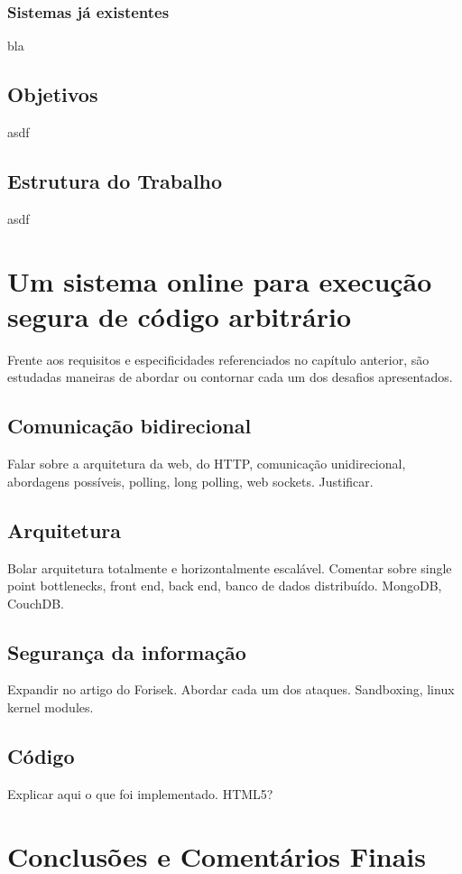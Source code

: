 \documentclass[ruledheader]{abnt}
\begin{document}
\subsection{Sistemas já existentes}

bla

\section{Objetivos}
asdf
\section{Estrutura do Trabalho}
asdf

\chapter{Um sistema online para execução segura de código arbitrário}

Frente aos requisitos e especificidades referenciados no capítulo anterior, são estudadas maneiras de abordar ou contornar cada um dos desafios apresentados.

\section{Comunicação bidirecional}

Falar sobre a arquitetura da web, do HTTP, comunicação unidirecional, abordagens possíveis, polling, long polling, web sockets. Justificar.

\section{Arquitetura}

Bolar arquitetura totalmente e horizontalmente escalável. Comentar sobre single point bottlenecks, front end, back end, banco de dados distribuído. MongoDB, CouchDB.

\section{Segurança da informação}

Expandir no artigo do Forisek. Abordar cada um dos ataques. Sandboxing, linux kernel modules.

\section{Código}

Explicar aqui o que foi implementado. HTML5?

\chapter{Conclusões e Comentários Finais}


\end{document}
